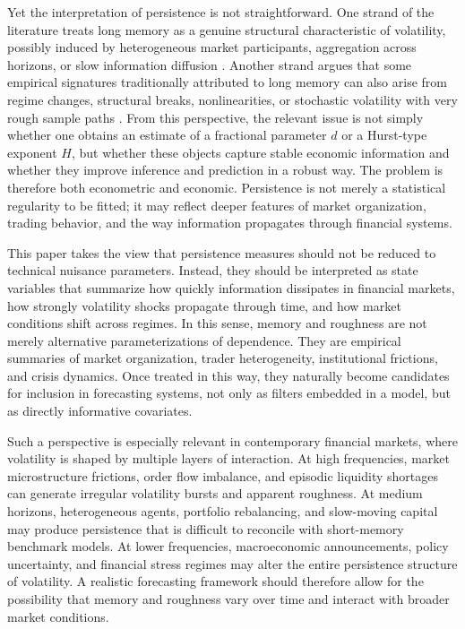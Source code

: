 \documentclass[12pt]{article}
\begin{document}
Yet the interpretation of persistence is not straightforward. One strand of the literature treats long memory as a genuine structural characteristic of volatility, possibly induced by heterogeneous market participants, aggregation across horizons, or slow information diffusion \citep{Muller1997, Corsi2009}. Another strand argues that some empirical signatures traditionally attributed to long memory can also arise from regime changes, structural breaks, nonlinearities, or stochastic volatility with very rough sample paths \citep{MikoschStarica2004, Gatheral2018}. From this perspective, the relevant issue is not simply whether one obtains an estimate of a fractional parameter $d$ or a Hurst-type exponent $H$, but whether these objects capture stable economic information and whether they improve inference and prediction in a robust way. The problem is therefore both econometric and economic. Persistence is not merely a statistical regularity to be fitted; it may reflect deeper features of market organization, trading behavior, and the way information propagates through financial systems.

This paper takes the view that persistence measures should not be reduced to technical nuisance parameters. Instead, they should be interpreted as state variables that summarize how quickly information dissipates in financial markets, how strongly volatility shocks propagate through time, and how market conditions shift across regimes. In this sense, memory and roughness are not merely alternative parameterizations of dependence. They are empirical summaries of market organization, trader heterogeneity, institutional frictions, and crisis dynamics. Once treated in this way, they naturally become candidates for inclusion in forecasting systems, not only as filters embedded in a model, but as directly informative covariates.

Such a perspective is especially relevant in contemporary financial markets, where volatility is shaped by multiple layers of interaction. At high frequencies, market microstructure frictions, order flow imbalance, and episodic liquidity shortages can generate irregular volatility bursts and apparent roughness. At medium horizons, heterogeneous agents, portfolio rebalancing, and slow-moving capital may produce persistence that is difficult to reconcile with short-memory benchmark models. At lower frequencies, macroeconomic announcements, policy uncertainty, and financial stress regimes may alter the entire persistence structure of volatility. A realistic forecasting framework should therefore allow for the possibility that memory and roughness vary over time and interact with broader market conditions.
\end{document}
